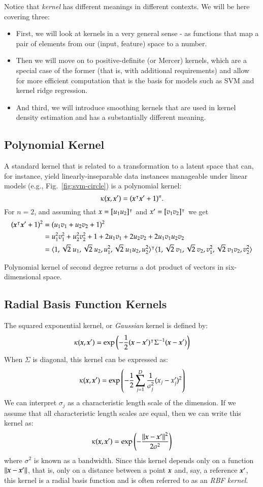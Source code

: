 \begin{refsection}
Notice that \emph{kernel} has different meanings in different contexts. We will be here covering three:

\begin{itemize}
\item First, we will look at kernels in a very general sense - as functions that map a pair of elements from our (input, feature) space to a number.
\item Then we will move on to positive-definite (or Mercer) kernels, which are a special case of the former (that is, with additional requirements) and allow for more efficient computation that is the basis for models such as SVM and kernel ridge regression.
\item And third, we will introduce smoothing kernels that are used in kernel density estimation and has a substantially different meaning.
\end{itemize}

\subsection*{Polynomial Kernel}

A standard kernel that is related to a transformation to a latent space that can, for instance, yield linearly-inseparable data instances manageable under linear models (e.g., Fig.~\ref{fig:svm-circle}) is a polynomial kernel:
$$ \kappa(\boldsymbol{x},\boldsymbol{x}')=(\boldsymbol{x}^\intercal \boldsymbol{x}'+1)^n.$$
For $n=2$, and assuming that $x=[u_1 u_2]^\intercal$ and $x'=[v_1 v_2]^\intercal$ we get
\begin{align*}
(\boldsymbol{x}^\intercal \boldsymbol{x}'+1)^2 & = (u_1 v_1 + u_2 v_2 +1)^2 \\
& = u_1^2 v_1^2 + u_2^2 v_2^2 + 1 + 2 u_1 v_1 + 2 u_2 v_2 + 2 u_1 v_1 u_2 v_2 \\
& = \langle 1, \sqrt{2}\ u_1, \sqrt{2}\ u_2, u_1^2, \sqrt{2}\ u_1 u_2, u_2^2\rangle^\intercal  \langle 1, \sqrt{2}\ v_1, \sqrt{2}\ v_2, v_1^2, \sqrt{2}\ v_1 v_2, v_2^2\rangle
\end{align*}

Polynomial kernel of second degree returns a dot product of vectors in six-dimensional space.

\subsection*{Radial Basis Function Kernels}

The squared exponential kernel, or {\em Gaussian} kernel is defined by:
$$ \kappa(\boldsymbol{x}, \boldsymbol{x}')=\exp\left( -{1\over 2}(\boldsymbol{x}-\boldsymbol{x}')^\intercal\Sigma^{-1}(\boldsymbol{x}-\boldsymbol{x}') \right) $$
When $\Sigma$ is diagonal, this kernel can be expressed as:
$$ \kappa(\boldsymbol{x},\boldsymbol{x}')=\exp\left(-{1\over 2}\sum_{j=1}^D {1\over\sigma_j^2}(x_j-x_j')^2 \right) $$
We can interpret $\sigma_j$ as a characteristic length scale of the dimension. If we assume that all characteristic length scales are equal, then we can write this kernel as:
$$ \kappa(\boldsymbol{x},\boldsymbol{x}')=\exp\left( - {\left\lVert\boldsymbol{x}-\boldsymbol{x}'\right\rVert^2\over 2\sigma^2}\right) $$
where $\sigma^2$ is known as a bandwidth. Since this kernel depends only on a function $\left\lVert\boldsymbol{x}-\boldsymbol{x}'\right\rVert$, that is, only on a distance between a point $\boldsymbol{x}$ and, say, a reference $\boldsymbol{x}'$, this kernel is a radial basis function and is often referred to as an {\em RBF kernel}.


\end{refsection}
